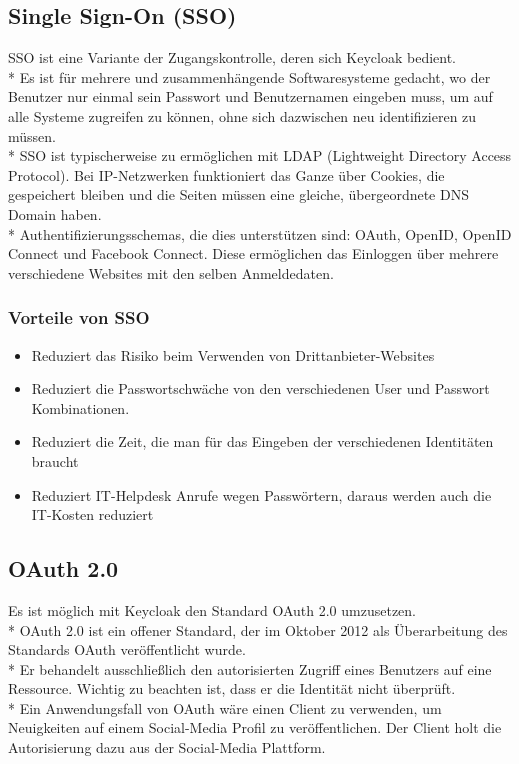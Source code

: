 \subsection{Single Sign-On (SSO)}
\label{sec:SSO}
SSO ist eine Variante der Zugangskontrolle, deren sich Keycloak bedient. \\*
Es ist für mehrere und zusammenhängende Softwaresysteme gedacht, wo der Benutzer nur einmal sein Passwort und Benutzernamen eingeben muss, um auf alle Systeme zugreifen zu können,
ohne sich dazwischen neu identifizieren zu müssen.\\* SSO ist typischerweise zu ermöglichen mit LDAP (Lightweight Directory Access Protocol). Bei IP-Netzwerken funktioniert das Ganze über Cookies, die gespeichert bleiben 
und die Seiten müssen eine gleiche, übergeordnete DNS Domain haben.\\* 
Authentifizierungsschemas, die dies unterstützen sind: OAuth, OpenID, OpenID Connect und Facebook Connect. Diese ermöglichen das Einloggen über mehrere verschiedene Websites mit den selben Anmeldedaten.\cite{KeycloakMakeIT}
\subsubsection{Vorteile von SSO}
\begin{itemize}
    \item Reduziert das Risiko beim Verwenden von Drittanbieter-Websites
    \item Reduziert die Passwortschwäche von den verschiedenen User und Passwort Kombinationen.
    \item Reduziert die Zeit, die man für das Eingeben der verschiedenen Identitäten braucht
    \item Reduziert IT-Helpdesk Anrufe wegen Passwörtern, daraus werden auch die IT-Kosten reduziert \cite{KeycloakMakeIT}
\end{itemize}

\subsection{OAuth 2.0}
Es ist möglich mit Keycloak den Standard OAuth 2.0 umzusetzen. \\*
OAuth 2.0 ist ein offener Standard, der im Oktober 2012 als Überarbeitung des Standards OAuth veröffentlicht wurde. \\*
Er behandelt ausschließlich den autorisierten Zugriff eines Benutzers auf eine Ressource. Wichtig zu beachten ist, dass er die Identität nicht überprüft. \\*
Ein Anwendungsfall von OAuth wäre einen Client zu verwenden, um Neuigkeiten auf einem Social-Media Profil zu veröffentlichen. Der Client holt die Autorisierung dazu aus der Social-Media Plattform. \cite{OAuthIonos} \cite{KeycloakCodeCentric}
\pagebreak

